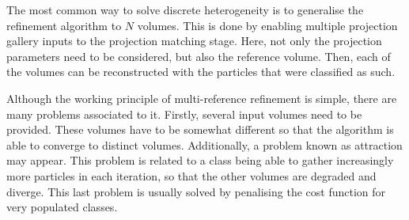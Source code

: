 \documentclass[../main.tex]{subfiles}
\begin{document}
The most common way to solve discrete heterogeneity is to generalise the refinement algorithm to $N$ volumes. This is done by enabling multiple projection gallery inputs to the projection matching stage. Here, not only the projection parameters need to be considered, but also the reference volume. Then, each of the volumes can be reconstructed with the particles that were classified as such\cite{scheres2005}.

Although the working principle of multi-reference refinement is simple, there are many problems associated to it. Firstly, several input volumes need to be provided. These volumes have to be somewhat different so that the algorithm is able to converge to distinct volumes. Additionally, a problem known as attraction may appear. This problem is related to a class being able to gather increasingly more particles in each iteration, so that the other volumes are degraded and diverge. This last problem is usually solved by penalising the cost function for very populated classes\cite{sorzano2022}.
\end{document}
